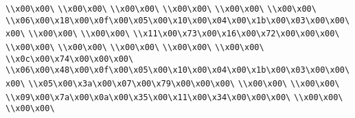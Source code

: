 \verb|\\x00\x00\|\newline
\verb|\\x00\x00\|\newline
\verb|\\x00\x00\|\newline
\verb|\\x00\x00\|\newline
\verb|\\x00\x00\|\newline
\verb|\\x00\x00\|\newline
\verb|\\x06\x00\x18\x00\x0f\x00\x05\x00\x10\x00\x04\x00\x1b\x00\x03\x00\x00\x00\|\newline
\verb|\\x00\x00\|\newline
\verb|\\x00\x00\|\newline
\verb|\\x11\x00\x73\x00\x16\x00\x72\x00\x00\x00\|\newline
\verb|\\x00\x00\|\newline
\verb|\\x00\x00\|\newline
\verb|\\x00\x00\|\newline
\verb|\\x00\x00\|\newline
\verb|\\x00\x00\|\newline
\verb|\\x0c\x00\x74\x00\x00\x00\|\newline
\verb|\\x06\x00\x48\x00\x0f\x00\x05\x00\x10\x00\x04\x00\x1b\x00\x03\x00\x00\x00\|\newline
\verb|\\x05\x00\x3a\x00\x07\x00\x79\x00\x00\x00\|\newline
\verb|\\x00\x00\|\newline
\verb|\\x00\x00\|\newline
\verb|\\x09\x00\x7a\x00\x0a\x00\x35\x00\x11\x00\x34\x00\x00\x00\|\newline
\verb|\\x00\x00\|\newline
\verb|\\x00\x00\|\newline
